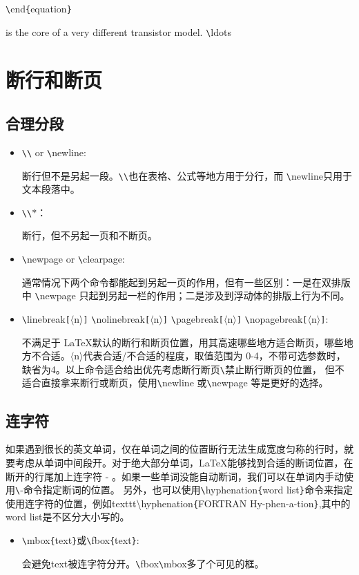 \documentclass[UTF8]{ctexart}
\begin{document}
\texttt{\textbackslash}end\texttt{\{}equation\texttt{\}}

is the core of a very different transistor model. \texttt{\textbackslash}ldots
\section{断行和断页}
\subsection{合理分段}
\begin{itemize}
  \item \texttt{\textbackslash}\texttt{\textbackslash} or \texttt{\textbackslash}newline:

  断行但不是另起一段。\texttt{\textbackslash}\texttt{\textbackslash}也在表格、公式等地方用于分行，而
\texttt{\textbackslash}newline只用于文本段落中。
  \item \texttt{\textbackslash}\texttt{\textbackslash}\texttt{$\ast$}：

  断行，但不另起一页和不断页。
  \item \texttt{\textbackslash}newpage or \texttt{\textbackslash}clearpage:

  通常情况下两个命令都能起到另起一页的作用，但有一些区别：一是在双排版中 \texttt{\textbackslash}newpage 只起到另起一栏的作用；二是涉及到浮动体的排版上行为不同。

  \item \texttt{\textbackslash}linebreak\texttt{[}$\langle$n$\rangle$\texttt{]} \texttt{\textbackslash}nolinebreak\texttt{[}$\langle$n$\rangle$\texttt{]} \texttt{\textbackslash}pagebreak\texttt{[}$\langle$n$\rangle$\texttt{]}
  \texttt{\textbackslash}nopagebreak\texttt{[}$\langle$n$\rangle$\texttt{]}:

  不满足于 \LaTeX 默认的断行和断页位置，用其高速哪些地方适合断页，哪些地方不合适。$\langle$n$\rangle$代表合适/不合适的程度，取值范围为 0-4，不带可选参数时，缺省为4。以上命令适合给出优先考虑断行断页\texttt{\textbackslash}禁止断行断页的位置，
  但不适合直接拿来断行或断页，使用\texttt{\textbackslash}newline 或\texttt{\textbackslash}newpage 等是更好的选择。
\end{itemize}
\subsection{连字符}
如果遇到很长的英文单词，仅在单词之间的位置断行无法生成宽度匀称的行时，就要考虑从单词中间段开。对于绝大部分单词，\LaTeX 能够找到合适的断词位置，在断开的行尾加上连字符 - 。如果一些单词没能自动断词，我们可以在单词内手动使用\texttt{\textbackslash}-命令指定断词的位置。
另外，也可以使用\texttt{\textbackslash}hyphenation\texttt{\{}word list\texttt{\}}命令来指定使用连字符的位置，例如texttt{\textbackslash}hyphenation\texttt{\{}FORTRAN Hy-phen-a-tion\texttt{\}},其中的word list是不区分大小写的。
\begin{itemize}
   \item \texttt{\textbackslash}mbox\texttt{\{}text\texttt{\}}或\texttt{\textbackslash}fbox\texttt{\{}text\texttt{\}}:

   会避免text被连字符分开。\texttt{\textbackslash}fbox\texttt{\textbackslash}mbox多了个可见的框。
\end{itemize}
\end{document}
